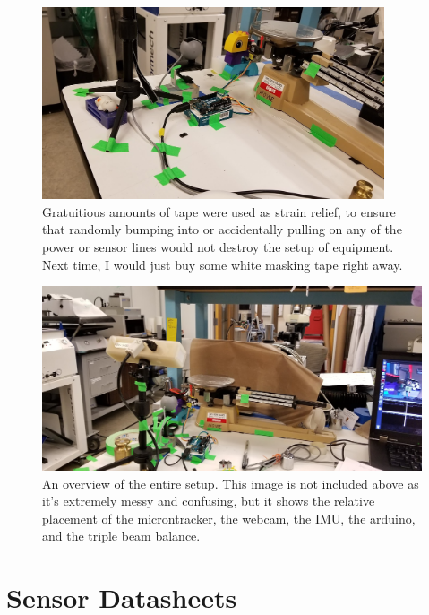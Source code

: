 \documentclass[preprint,12pt,3p]{elsarticle}
\begin{document}
\begin{figure}[H]
\centering
\includegraphics[width=0.9\textwidth]{images/setup/setup_closeup_tape.jpg}
\caption{Gratuitious amounts of tape were used as strain relief, to ensure that randomly bumping into or accidentally pulling on any of the power or sensor lines would not destroy the setup of equipment. Next time, I would just buy some white masking tape right away.
}
\end{figure}


\begin{figure}[H]
\centering
\includegraphics[width=1\textwidth]{images/setup/setup_overview.jpg}
\caption{An overview of the entire setup. This image is not included above as it's extremely messy and confusing, but it shows the relative placement of the microntracker, the webcam, the IMU, the arduino, and the triple beam balance.
}
\end{figure}

\section{Sensor Datasheets}
\label{appendix-sensors}
\end{document}
